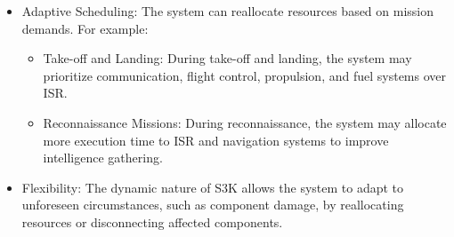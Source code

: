 \begin{itemize}
\begin{itemize}
			\item Adaptive Scheduling: 
				The system can reallocate resources based on mission demands. For example:
				\begin{itemize}
					\item Take-off and Landing: 
						During take-off and landing, the system may prioritize communication, flight control, propulsion, and fuel systems over ISR.
					\item Reconnaissance Missions: 
						During reconnaissance, the system may allocate more execution time to ISR and navigation systems to improve intelligence gathering.
				\end{itemize}
			\item Flexibility: 
				The dynamic nature of S3K allows the system to adapt to unforeseen circumstances, such as component damage, by reallocating resources or disconnecting affected components.
		\end{itemize}


\end{itemize}

